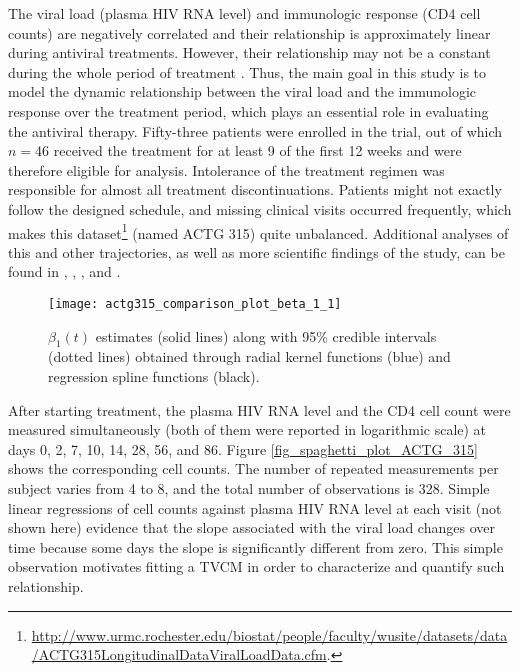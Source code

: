 \documentclass[letterpaper,10pt,openany]{article}
\begin{document}
The viral load (plasma HIV RNA level) and immunologic response (CD4 cell counts) are negatively correlated and their relationship is approximately linear during antiviral treatments. However, their relationship may not be a constant during the whole period of treatment \cite{liang-2003-relationship}. Thus, the main goal in this study is to model the dynamic relationship between the viral load and the immunologic response over the treatment period, which plays an essential role in evaluating the antiviral therapy. Fifty-three patients were enrolled in the trial, out of which $n=46$ received the treatment for at least 9 of the first 12 weeks and were therefore eligible for analysis. Intolerance of the treatment regimen was responsible for almost all treatment discontinuations. Patients might not exactly follow the designed schedule, and missing clinical visits occurred frequently, which makes this dataset\footnote{\url{http://www.urmc.rochester.edu/biostat/people/faculty/wusite/datasets/data/ACTG315LongitudinalDataViralLoadData.cfm}.} (named ACTG 315) quite unbalanced. Additional analyses of this and other trajectories, as well as more scientific findings of the study, can be found in \cite{lederman-98}, \cite{connick-00}, \cite{liang-2003-relationship}, and \cite{wu-2004-backfitting}.


\begin{figure}[!t]
	\centering
	\texttt{[image: actg315\_comparison\_plot\_beta\_1\_1]}
	\caption{$\beta_1(t)$ estimates (solid lines) along with 95\% credible intervals (dotted lines) obtained through radial kernel functions (blue) and regression spline functions (black).}\label{fig_fitted_curve_ACTG_315}
\end{figure}


After starting treatment, the plasma HIV RNA level and the CD4 cell count were measured simultaneously (both of them were reported in logarithmic scale) at days 0, 2, 7, 10, 14, 28, 56, and 86. Figure \ref{fig_spaghetti_plot_ACTG_315} shows the corresponding cell counts. The number of repeated measurements per subject varies from 4 to 8, and the total number of observations is 328. Simple linear regressions of cell counts against plasma HIV RNA level at each visit (not shown here) evidence that the slope associated with the viral load changes over time because some days the slope is significantly different from zero. This simple observation motivates fitting a TVCM in order to characterize and quantify such relationship.
\end{document}
